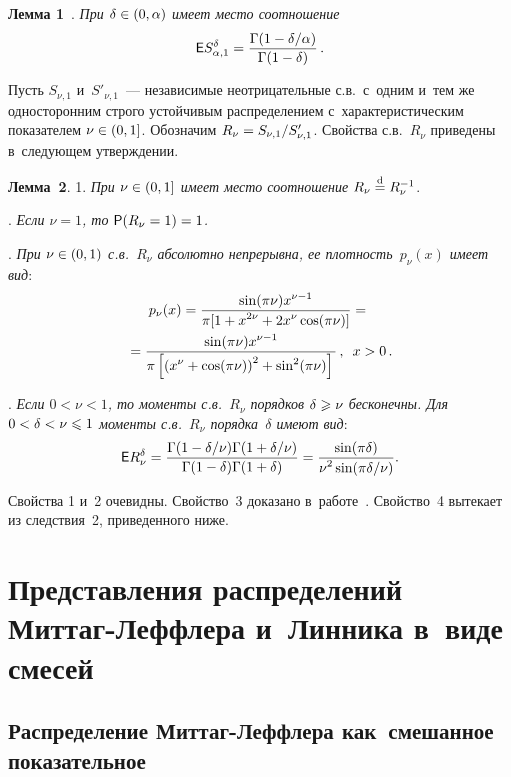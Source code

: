 \begin{multicols}{2}
\smallskip

\noindent
\textbf{Лемма 1}~\cite{KorolevWeibull2016}. \textit{При
$\delta\hm\in(0,\alpha)$ имеет место соотношение}
$$
{\sf E}S_{\alpha,1}^{\delta}=\displaystyle\frac{\displaystyle \Gamma(1-\delta/\alpha)\mathstrut}{\displaystyle \Gamma(1-\delta)\mathstrut}\,.
$$

\smallskip

Пусть $S_{\nu,1}$ и~$S'_{\nu,1}$~--- независимые неотрицательные
с.в.\ с~одним и~тем же односторонним строго устойчивым
распределением с~характеристическим показателем $\nu\hm\in(0,1]$.
Обозначим $R_{\nu}\hm=S_{\nu,1}/S'_{\nu,1}$. Свойства с.в.~$R_{\nu}$
приведены в~следующем утверждении.

\smallskip

\noindent
\textbf{Лемма~2}. 1. \textit{При $\nu\hm\in(0,1]$ имеет место соотношение}
$R_{\nu}\hm\eqd R_{\nu}^{-1}$.

. \textit{Если $\nu=1$, то ${\sf P}(R_{\nu}\hm=1)\hm=1$.}

. \textit{При $\nu\hm\in(0,1)$ с.в.~$R_{\nu}$ абсолютно
непрерывна, ее плотность~$p_{\nu}(x)$ имеет вид}:
\begin{multline*}
p_{\nu}(x)=\displaystyle\frac{\displaystyle \sin(\pi\nu)x^{\nu-1}\mathstrut}{\displaystyle \pi[1+x^{2\nu}+2x^{\nu}\cos(\pi\nu)]\mathstrut}={}\\
{}=
\displaystyle\frac{\displaystyle \sin(\pi\nu)x^{\nu-1}\mathstrut}{\displaystyle \pi\left[\left(x^{\nu}+\cos(\pi\nu)\right)^2+\sin^2(\pi\nu)\right]\mathstrut}\,,\enskip
x>0\,.
\end{multline*}

. \textit{Если $0<\nu<1$, то моменты с.в.~$R_{\nu}$
порядков $\delta\hm\geqslant\nu$ бесконечны. Для $0\hm<\delta\hm<\nu\hm\leqslant1$ моменты
с.в.~$R_{\nu}$ порядка~$\delta$ имеют вид}:
$$
{\sf E}R_{\nu}^{\delta}=\displaystyle\frac{\displaystyle \Gamma(1-{\delta}/{\nu})\Gamma(1+{\delta}/{\nu})\mathstrut}{\displaystyle \Gamma(1-\delta)\Gamma(1+\delta)\mathstrut}=
\displaystyle\frac{\displaystyle \sin(\pi\delta)\mathstrut}{\displaystyle \nu^2\sin({\pi\delta}/{\nu})\mathstrut}.
$$

\smallskip

Свойства 1 и~2 очевидны. Свойство~3 доказано в~работе~\cite{KorolevZeifman2017}. 
Свойство~4 вытекает из следствия~2, приведенного ниже.

\section{Представления распределений Миттаг-Леффлера и~Линника в~виде смесей}

\subsection{Распределение Миттаг-Леффлера как~смешанное показательное}


\end{multicols}
